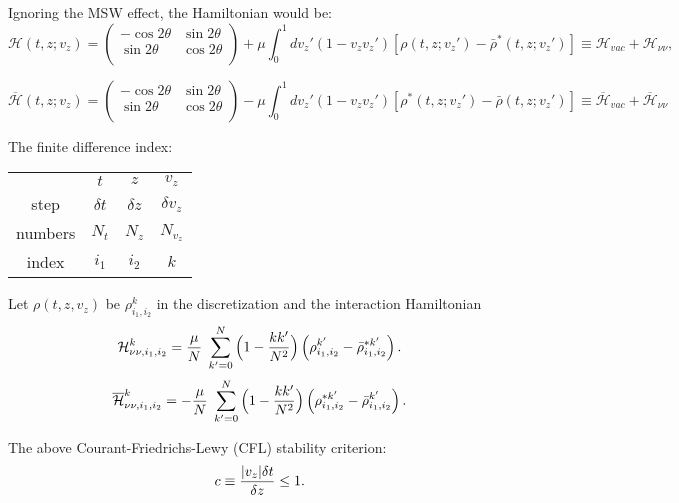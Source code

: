 \documentclass[11pt,a4paper]{article}
\begin{document}
\noindent Ignoring the MSW effect, the Hamiltonian would be: 
\begin{equation*}
   \mathcal{H}(t,z;v_z)=
\begin{pmatrix}
 -\cos 2\theta & \sin 2\theta\\
\sin 2\theta & \cos 2\theta \\
\end{pmatrix}
+
\mu \int_0^1 dv_z' (1-v_{z} v_z')
[\rho(t,z;v_z')-\bar\rho^*(t,z;v_z')]
\equiv \mathcal{H}_{vac} + \mathcal{H}_{\nu\nu},
\end{equation*}

\begin{equation*}
   \overline{\mathcal{H}}(t,z;v_z)=
\begin{pmatrix}
   -\cos 2\theta & \sin 2\theta\\
    \sin 2\theta & \cos 2\theta \\
\end{pmatrix}
-
\mu \int_0^1 dv_z' (1-v_{z} v_z')
[\rho^*(t,z;v_z')-\bar\rho(t,z;v_z')]
\equiv \overline{\mathcal{H}}_{vac} + \overline{\mathcal{H}}_{\nu\nu}
\end{equation*}

\noindent The finite difference index:

\begin{center}
   \begin{tabular}{c c c c}
      & $t$ & $z$ & $v_{z}$ \\
      step & $\delta t$ &  $\delta z$ &  $\delta v_{z}$\\
      numbers& $N_{t}$ & $N_{z}$ & $N_{v_{z}}$ \\
      index & $i_1$ & $i_2$ & $k$
   \end{tabular}
\end{center}

\noindent Let $\rho(t,z, v_{z})$ be $\rho^{k}_{i_1, i_2}$ in the discretization and the interaction Hamiltonian\\
\[
\mathcal{H}^{k}_{\nu\nu, i_1, i_2}  = \frac{\mu}{N} \hspace{0.1cm}\sum_{k'=0}^{N} \Big(1 - \frac{kk'}{N^{2}}\Big) \left( \rho^{k'}_{i_1, i_2} - \bar\rho^{*k'}_{i_1, i_2}\right).\] 
\[
\overline{\mathcal{H}}^{k}_{\nu\nu, i_1, i_2}  = -\frac{\mu}{N} \hspace{0.1cm}\sum_{k'=0}^{N} \Big(1 - \frac{kk'}{N^{2}}\Big) \left( \rho^{*k'}_{i_1, i_2} - \bar\rho^{k'}_{i_1, i_2}\right).\] 



\noindent The above Courant-Friedrichs-Lewy (CFL) stability criterion:
\[
c \equiv \frac{\abs{v_{z}}\delta t}{\delta z}\leq 1 .\] 
\end{document}
